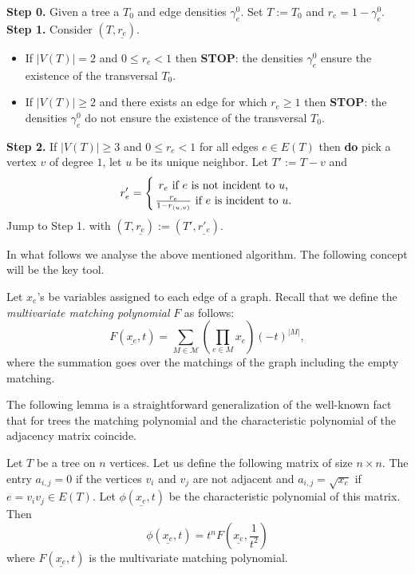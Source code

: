 \documentclass[12pt,a4paper]{amsart}
\numberwithin{equation}{section}
\begin{document}
\begin{Al} \label{tree-alg} 

\textbf{Step 0.} Given a tree a $T_0$ and edge densities $\gamma^0_e$. Set
$T:=T_0$ and $r_e=1-\gamma^0_e$.\\
\textbf{Step 1.} Consider $(T,\underline{r_e})$. 
\begin{itemize}
\item If $|V(T)|=2$ and $0\leq r_e<1$ then \textbf{STOP}: the 
  densities $\gamma^0_e$ ensure the existence of the transversal $T_0$.
\item If $|V(T)|\geq 2$ and there exists an edge for which $r_e\geq 1$ then 
\textbf{STOP}: the densities  $\gamma^0_e$ do not ensure the existence of the
transversal $T_0$.\\
\end{itemize}
\textbf{Step 2.} If $|V(T)|\geq 3$ and $0\leq r_e<1$ for all edges $e\in E(T)$
then \textbf{do}  pick a vertex $v$ of degree $1$, let $u$ be its unique
  neighbor. Let $T':=T-v$ and 
$$r'_e=\left\{ {r_e \mbox{ if $e$ is not incident to $u$,}
    \atop     \frac{r_e}{1-r_{(u,v)}} \mbox{ if $e$ is incident
      to $u$.} }\right.$$
Jump to Step 1. with $(T,\underline{r_e}):=(T',\underline{r'_e})$.
\end{Al}

In what follows we analyse the above mentioned algorithm. The following
concept will be the key tool. 

Let $x_e$'s be variables assigned to each edge of a graph. Recall that we
define the \textit{multivariate matching polynomial}  $F$ as follows:
  $$F(\underline{x_e},t)=\sum_{M\in \mathcal{M}}(\prod_{e\in M}x_e)(-t)^{|M|},$$
where the summation goes over the matchings of the graph including the empty
matching. 

The following lemma is a straightforward generalization of the well-known
fact that for trees the matching polynomial and the characteristic polynomial
of the adjacency matrix coincide.
\bigskip

\begin{lemma} \label{char-match}
Let $T$ be a tree on $n$ vertices.
Let us define the following matrix of size $n\times n$. 
The entry $a_{i,j}=0$ if the vertices $v_i$ and $v_j$ are not adjacent and
$a_{i,j}=\sqrt{x_e}$ if $e=v_iv_j\in E(T)$. Let $\phi(\underline{x_e},t)$ be the
characteristic polynomial of this matrix. Then
$$\phi(\underline{x_e},t)=t^nF(\underline{x_e},\frac{1}{t^2})$$
where $F(\underline{x_e},t)$ is the multivariate matching polynomial.
\end{lemma}
\end{document}
